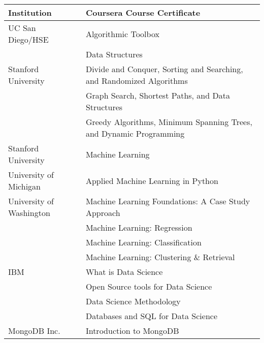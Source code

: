 \documentclass[$if(fontsize)$$fontsize$,$endif$$if(lang)$$babel-lang$,$endif$$if(papersize)$$papersize$paper,$endif$$for(classoption)$$classoption$$sep$,$endfor$]{$documentclass$}
\begin{document}
\vspace{-4mm}

\begin{longtable}[c]{|p{4.5cm}|p{14.5cm}|}  %
  \toprule
  \textbf{Institution} & \textbf{Coursera Course Certificate} \\
  \midrule
  \endfirsthead
  UC San Diego/HSE          & Algorithmic Toolbox                                                  \\
                            & Data Structures                                                      \\
  Stanford University       & Divide and Conquer, Sorting and Searching, and Randomized Algorithms \\
                            & Graph Search, Shortest Paths, and Data Structures                    \\
                            & Greedy Algorithms, Minimum Spanning Trees, and Dynamic Programming   \\
  \midrule
  Stanford University       & Machine Learning                                                     \\
  University of Michigan    & Applied Machine Learning in Python                                   \\
  University of Washington  & Machine Learning Foundations: A Case Study Approach                  \\
                            & Machine Learning: Regression                                         \\
                            & Machine Learning: Classification                                     \\
                            & Machine Learning: Clustering \& Retrieval                            \\
  \midrule
  IBM                       & What is Data Science                                                 \\
                            & Open Source tools for Data Science                                   \\
                            & Data Science Methodology                                             \\
                            & Databases and SQL for Data Science                                   \\
  \midrule
  MongoDB Inc.              & Introduction to MongoDB                                              \\

\end{longtable}
\end{document}
